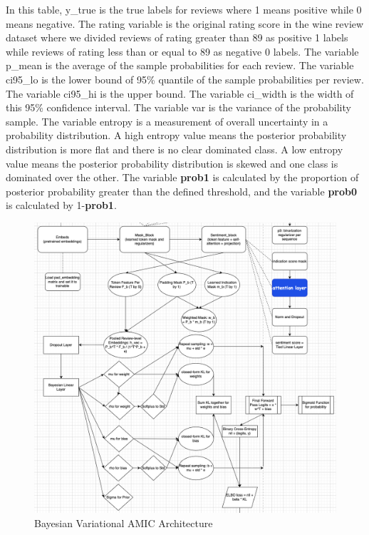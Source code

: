\documentclass{article}
\begin{document}
In this table, y\_true is the true labels for reviews where 1 means positive while 0 means negative. The rating variable is the original rating score in the wine review dataset where we divided reviews of rating greater than 89 as positive 1 labels while reviews of rating less than or equal to 89 as negative 0 labels. The variable p\_mean is the average of the sample probabilities for each review. The variable ci95\_lo is the lower bound of 95\% quantile of the sample probabilities per review. The variable ci95\_hi is the upper bound. The variable ci\_width is the width of this 95\% confidence interval. The variable var is the variance of the probability sample. The variable entropy is a measurement of overall uncertainty in a probability distribution. A high entropy value means the posterior probability distribution is more flat and there is no clear dominated class. A low entropy value means the posterior probability distribution is skewed and one class is dominated over the other. The variable \textbf{prob1} is calculated by the proportion of posterior probability greater than the defined threshold, and the variable \textbf{prob0} is calculated by 1-\textbf{prob1}. 


\begin{figure}[!ht]
    \centering
    \includegraphics[width=1\linewidth]{Bayes.png}
    \caption{Bayesian Variational AMIC Architecture}
    \label{fig:Bayes}
\end{figure}
\end{document}
